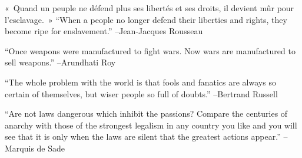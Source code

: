 \documentclass{article}%
\begin{document}
\linebreak%
\vspace{1mm}%
\begin{minipage}{\textwidth}%
\flushleft%
«~Quand un peuple ne défend plus ses libertés et ses droits, il devient mûr pour l'esclavage.~»%
\linebreak%
\vspace{1mm}%
“When a people no longer defend their liberties and rights, they become ripe for enslavement.”%
\linebreak%
–Jean{-}Jacques Rousseau%
\linebreak%
\vspace{1mm}%
\end{minipage}%
\linebreak%
\vspace{1mm}%
\begin{minipage}{\textwidth}%
\flushleft%
“Once weapons were manufactured to fight wars. Now wars are manufactured to sell weapons.”%
\linebreak%
\vspace{1mm}%
–Arundhati Roy%
\linebreak%
\vspace{1mm}%
\end{minipage}%
\linebreak%
\vspace{1mm}%
\begin{minipage}{\textwidth}%
\flushleft%
“The whole problem with the world is that fools and fanatics are always so certain of themselves, but wiser people so full of doubts.”%
\linebreak%
\vspace{1mm}%
–Bertrand Russell%
\linebreak%
\vspace{1mm}%
\end{minipage}%
\linebreak%
\vspace{1mm}%
\begin{minipage}{\textwidth}%
\flushleft%
“Are not laws dangerous which inhibit the passions? Compare the centuries of anarchy with those of the strongest legalism in any country you like and you will see that it is only when the laws are silent that the greatest actions appear.”%
\linebreak%
\vspace{1mm}%
–Marquis de Sade%
\linebreak%
\vspace{1mm}%
\end{minipage}%
\end{document}
